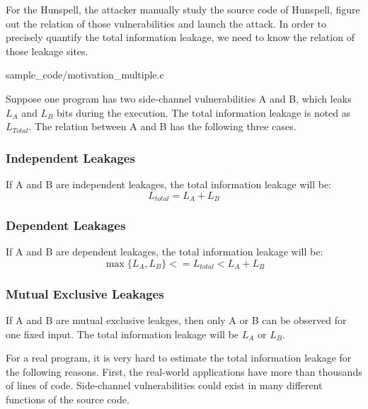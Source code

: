 For the Hunspell, the attacker manually study the source code of Hunspell, figure out
the relation of those vulnerabilities and launch the attack. In order to precisely quantify the
total information leakage, we need to know the relation of those leakage sites. 


                 {sample_code/motivation_multiple.c}


Suppose one program has two side-channel vulnerabilities A and B, which leaks $L_A$ and $L_B$ bits
during the execution. The total information leakage is noted as $L_{Total}$. The relation between
A and B has the following three cases.

\subsubsection{Independent Leakages}
If A and B are independent leakages, the total information leakage will be:
\begin{equation}
\label{independent leakage}
    L_{total} = L_A + L_B \nonumber
\end{equation} 

\subsubsection{Dependent Leakages}
If A and B are dependent leakages, the total information leakage will be:
\begin{equation}
\label{dependent leakage}
    \max{\{L_A, L_B\}}  <= L_{total} < L_A + L_B \nonumber
\end{equation}

\subsubsection{Mutual Exclusive Leakages}
If A and B are mutual exclusive leakges, then only A or B can be observed for one fixed input.
The total information leakage will be $L_A$ or $L_B$.


For a real program, it is very hard to estimate the total information leakage for the following reasons.
First, the real-world applications have more than thousands of lines of code. Side-channel vulnerabilities
could exist in many different functions of the source code. 


